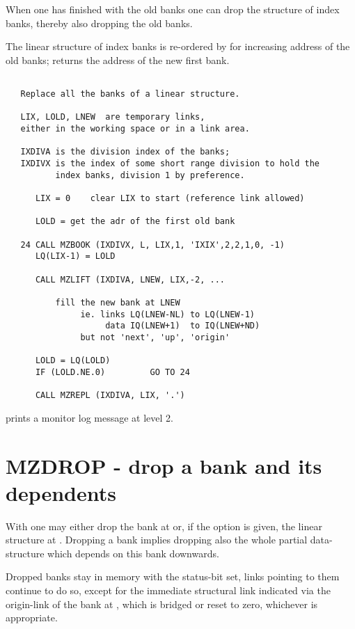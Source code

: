 When one has finished with the old banks one can drop the
structure of index banks, thereby also dropping the old banks.

The linear structure of index banks is re-ordered by  for
increasing address of the old banks;
 returns the address of the new first bank.


\Example

\begin{verbatim}

   Replace all the banks of a linear structure.

   LIX, LOLD, LNEW  are temporary links,
   either in the working space or in a link area.

   IXDIVA is the division index of the banks;
   IXDIVX is the index of some short range division to hold the
          index banks, division 1 by preference.

      LIX = 0    clear LIX to start (reference link allowed)

      LOLD = get the adr of the first old bank

   24 CALL MZBOOK (IXDIVX, L, LIX,1, 'IXIX',2,2,1,0, -1)
      LQ(LIX-1) = LOLD

      CALL MZLIFT (IXDIVA, LNEW, LIX,-2, ...

          fill the new bank at LNEW
               ie. links LQ(LNEW-NL) to LQ(LNEW-1)
                    data IQ(LNEW+1)  to IQ(LNEW+ND)
               but not 'next', 'up', 'origin'

      LOLD = LQ(LOLD)
      IF (LOLD.NE.0)         GO TO 24

      CALL MZREPL (IXDIVA, LIX, '.')
\end{verbatim} 

 prints a monitor log message at level 2.

\section{MZDROP - drop a bank and its dependents}

With  one may either drop the bank at  or,
if the  option is given, the linear structure at .
Dropping a bank implies dropping also the whole partial
data-structure which depends on this bank downwards.

Dropped banks stay in memory with the  status-bit set,
links pointing to them continue to do so,
except for the immediate structural link indicated via the
origin-link of the bank at , which is bridged or reset to zero,
whichever is appropriate.

